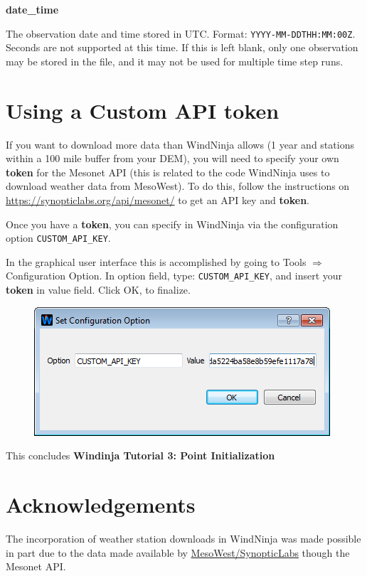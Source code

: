 \documentclass[12pt]{article}
\begin{document}
\textbf{date\_time}

The observation date and time stored in UTC. Format:  \texttt{YYYY-MM-DDTHH:MM:00Z}. Seconds are not supported at this time. If this is left blank, only one observation may be stored in the file, and it may not be used for multiple time step runs.

\section{Using a Custom API token}

If you want to download more data than WindNinja  allows (1 year and stations within a 100 mile buffer from your DEM), you will need to specify your own \textbf{token} for the Mesonet API (this is related to the code WindNinja uses to download weather data from MesoWest). To do this, follow the instructions on \url{https://synopticlabs.org/api/mesonet/} to get an API key and \textbf{token}.

Once you have a \textbf{token}, you can specify in WindNinja via the configuration option \texttt{CUSTOM\_API\_KEY}.

In the graphical user interface this is accomplished by going to Tools $\Rightarrow$ Configuration Option. In option field, type: \texttt{CUSTOM\_API\_KEY}, and insert your \textbf{token} in value field.  Click OK, to finalize.

\begin{figure}[H]
	\centering
	\label{}
	\includegraphics[scale=1]{api-config}
\end{figure}

This concludes \textbf{Windinja Tutorial 3: Point Initialization}

\section*{Acknowledgements}
The incorporation of weather station downloads in WindNinja was made possible in part due to the data made available by \href{https://synopticlabs.org/api/mesonet/}{MesoWest/SynopticLabs} though the Mesonet API.
\end{document}
